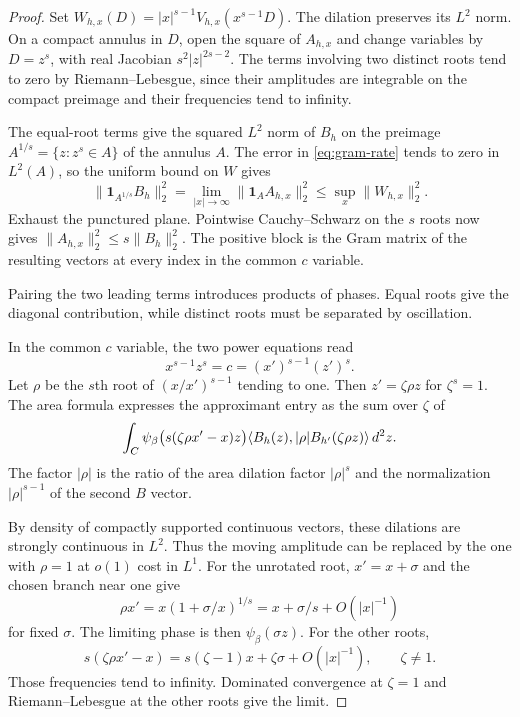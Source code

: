 \begin{proof}

Set \(W_{h,x}(D)=|x|^{s-1}V_{h,x}(x^{s-1}D)\).
The dilation preserves its \(L^2\) norm. On a compact annulus
in \(D\), open the square of \(A_{h,x}\) and change variables
by \(D=z^s\), with real Jacobian \(s^2|z|^{2s-2}\).
The terms involving two distinct roots tend to zero by
Riemann--Lebesgue, since their amplitudes are integrable on
the compact preimage and their frequencies tend to infinity.

The equal-root terms give the squared \(L^2\) norm of \(B_h\)
on the preimage \(A^{1/s}=\{z:z^s\in A\}\) of the annulus \(A\).
The error in \eqref{eq:gram-rate} tends to zero in \(L^2(A)\),
so the uniform bound on \(W\) gives
\[
 \|\mathbf 1_{A^{1/s}}B_h\|_2^2
    =\lim_{|x|\longrightarrow\infty}\|\mathbf 1_A A_{h,x}\|_2^2
    \le \sup_x\|W_{h,x}\|_2^2 .
\]
Exhaust the punctured plane. Pointwise Cauchy--Schwarz on the
\(s\) roots now gives \(\|A_{h,x}\|_2^2\le s\|B_h\|_2^2\).
The positive block is the Gram matrix of the resulting
vectors at every index in the common \(c\) variable.


Pairing the two leading terms introduces products of phases. Equal roots give the diagonal contribution, while distinct roots must be separated by oscillation.


In the common \(c\) variable, the two power equations read
\[
 x^{s-1}z^s=c=(x')^{s-1}(z')^s .
\]
Let \(\rho\) be the \(s\)th root of \((x/x')^{s-1}\) tending
to one. Then \(z'=\zeta\rho z\) for \(\zeta^s=1\).
The area formula expresses the approximant entry as the sum over
\(\zeta\) of
\[
 \int_{C}\psi_\beta\bigl(s(\zeta\rho x'-x)z\bigr)
     \langle B_h(z),|\rho|B_{h'}(\zeta\rho z)\rangle\,d^2z .
\]
The factor \(|\rho|\) is the ratio of the area dilation
factor \(|\rho|^s\) and the normalization
\(|\rho|^{s-1}\) of the second \(B\) vector.

By density of
compactly supported continuous vectors, these dilations
are strongly continuous in \(L^2\). Thus the moving amplitude
can be replaced by the one with \(\rho=1\) at \(o(1)\)
cost in \(L^1\). For the unrotated root, \(x'=x+\sigma\) and the chosen
branch near one give
\[
 \rho x'=x(1+\sigma/x)^{1/s}
       =x+\sigma/s+O(|x|^{-1})
\]
for fixed \(\sigma\). The limiting phase is then
\(\psi_\beta(\sigma z)\).
For the other roots,
\[
 s(\zeta\rho x'-x)=s(\zeta-1)x+\zeta\sigma+O(|x|^{-1}),
 \qquad \zeta\ne1 .
\]
Those frequencies tend to infinity. Dominated convergence at
\(\zeta=1\) and Riemann--Lebesgue at the other roots give the limit.


\end{proof}
